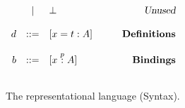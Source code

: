 \begin{figure}
\begin{center}
\begin{math}
\begin{array}{rclr}
&|&
\bot
& \qquad\textsl{Unused}
\\
\\
d 
&::=& 
[x = t : A] 
& \qquad\textsl{\bf Definitions}
\\
\\
b
&::=& [x \stackrel{p}{:} A]
& \qquad\textsl{\bf Bindings}
\\
\\
\end{array}
\end{math}
\end{center}

\caption{The {\system} representational language (Syntax).}
\label{fig:syntax-s2}
\end{figure}
